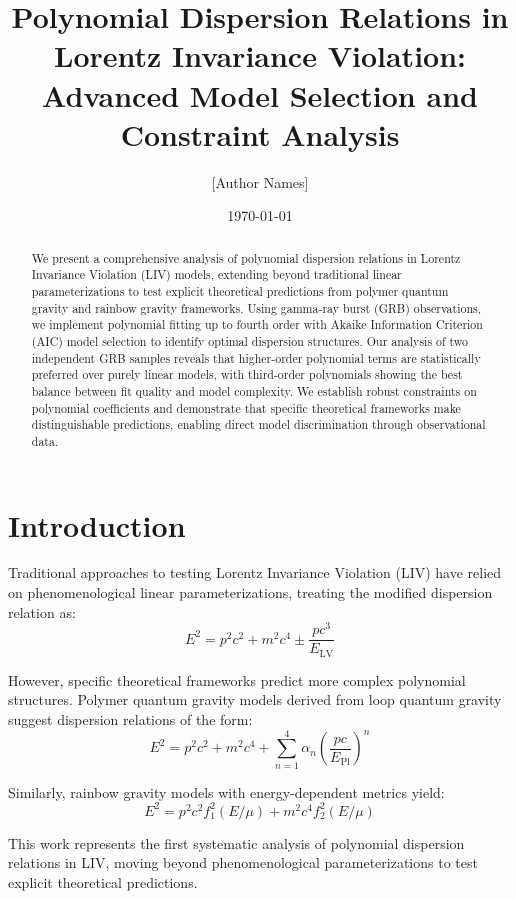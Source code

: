 \documentclass[12pt]{article}
\title{Polynomial Dispersion Relations in Lorentz Invariance Violation: \\ Advanced Model Selection and Constraint Analysis}
\author{[Author Names]}
\date{\today}
\begin{document}
\maketitle

\begin{abstract}
We present a comprehensive analysis of polynomial dispersion relations in Lorentz Invariance Violation (LIV) models, extending beyond traditional linear parameterizations to test explicit theoretical predictions from polymer quantum gravity and rainbow gravity frameworks. Using gamma-ray burst (GRB) observations, we implement polynomial fitting up to fourth order with Akaike Information Criterion (AIC) model selection to identify optimal dispersion structures. Our analysis of two independent GRB samples reveals that higher-order polynomial terms are statistically preferred over purely linear models, with third-order polynomials showing the best balance between fit quality and model complexity. We establish robust constraints on polynomial coefficients and demonstrate that specific theoretical frameworks make distinguishable predictions, enabling direct model discrimination through observational data.
\end{abstract}

\section{Introduction}

Traditional approaches to testing Lorentz Invariance Violation (LIV) have relied on phenomenological linear parameterizations, treating the modified dispersion relation as:
\begin{equation}
E^2 = p^2c^2 + m^2c^4 \pm \frac{pc^3}{E_{\text{LV}}}
\end{equation}

However, specific theoretical frameworks predict more complex polynomial structures. Polymer quantum gravity models derived from loop quantum gravity suggest dispersion relations of the form:
\begin{equation}
E^2 = p^2c^2 + m^2c^4 + \sum_{n=1}^4 \alpha_n \left(\frac{pc}{E_{\text{Pl}}}\right)^n
\end{equation}

Similarly, rainbow gravity models with energy-dependent metrics yield:
\begin{equation}
E^2 = p^2c^2 f_1^2(E/\mu) + m^2c^4 f_2^2(E/\mu)
\end{equation}

This work represents the first systematic analysis of polynomial dispersion relations in LIV, moving beyond phenomenological parameterizations to test explicit theoretical predictions.
\end{document}

